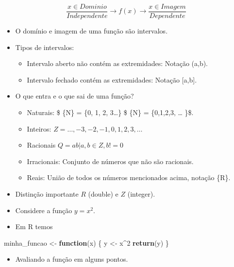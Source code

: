 \documentclass[
]{article}
\newenvironment{Shaded}{\begin{snugshade}}{\end{snugshade}}
\newcommand{\ControlFlowTok}[1]{\textcolor[rgb]{0.13,0.29,0.53}{\textbf{#1}}}
\newcommand{\DecValTok}[1]{\textcolor[rgb]{0.00,0.00,0.81}{#1}}
\newcommand{\FunctionTok}[1]{\textcolor[rgb]{0.13,0.29,0.53}{\textbf{#1}}}
\newcommand{\NormalTok}[1]{#1}
\newcommand{\OtherTok}[1]{\textcolor[rgb]{0.56,0.35,0.01}{#1}}
\newcommand{\SpecialCharTok}[1]{\textcolor[rgb]{0.81,0.36,0.00}{\textbf{#1}}}
\providecommand{\tightlist}{%
  \setlength{\itemsep}{0pt}\setlength{\parskip}{0pt}}
\begin{document}
\[ \frac{x \in Dominio}{Independente} \longrightarrow f(x) \longrightarrow \frac{x \in Imagem}{Dependente}\]

\begin{itemize}
\item
  O domínio e imagem de uma função são intervalos.
\item
  Tipos de intervalos:

  \begin{itemize}
  \tightlist
  \item
    Intervalo aberto não contém as extremidades: Notação (a,b).
  \item
    Intervalo fechado contém as extremidades: Notação {[}a,b{]}.
  \end{itemize}
\item
  O que entra e o que sai de uma função?

  \begin{itemize}
  \tightlist
  \item
    Naturais: \$ \{N\} = \{0, 1, 2, 3\ldots\} \$ \{N\} = \{0,1,2,3,
    \ldots{} \}\$.
  \item
    Inteiros: \({Z} = {… , -3, -2, -1, 0, 1,2,3, …}\)
  \item
    Racionais \({Q} = {ab |a, b \in {Z}, b {!=} 0}\)
  \item
    Irracionais: Conjunto de números que não são racionais.
  \item
    Reais: União de todos os números mencionados acima, notação \{R\}.
  \end{itemize}
\item
  Distinção importante \({R}\) (double) e \({Z}\) (integer).
\item
  Considere a função \(y = x^2\).
\item
  Em R temos
\end{itemize}

\begin{Shaded}
\begin{Highlighting}[]
\NormalTok{minha\_funcao }\OtherTok{\textless{}{-}} \ControlFlowTok{function}\NormalTok{(x) \{}
\NormalTok{  y }\OtherTok{\textless{}{-}}\NormalTok{ x}\SpecialCharTok{\^{}}\DecValTok{2}
  \FunctionTok{return}\NormalTok{(y)}
\NormalTok{\}}
\end{Highlighting}
\end{Shaded}

\begin{itemize}
\tightlist
\item
  Avaliando a função em alguns pontos.
\end{itemize}
\end{document}
